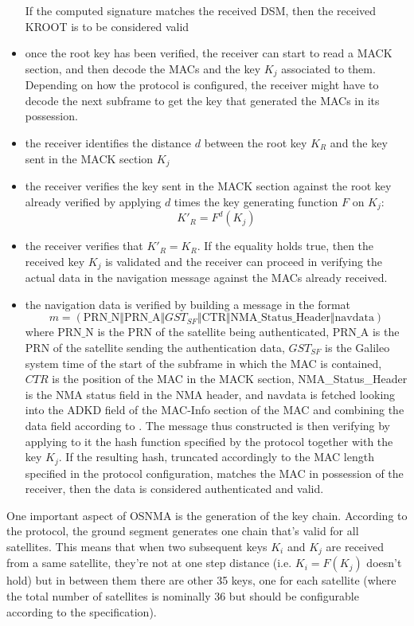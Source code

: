 \begin{itemize}
If the computed signature matches the received DSM, then the received KROOT is
to be considered valid
\item once the root key has been verified, the receiver can start to read a MACK
section, and then decode the MACs and the key $K_j$ associated to them.
Depending on how the protocol is configured, the receiver might have to decode
the next subframe to get the key that generated the MACs in its possession.
\item the receiver identifies the distance $d$ between the root key $K_R$ and
the key sent in the MACK section $K_j$
\item the receiver verifies the key sent in the MACK section against the root
key already verified by applying $d$ times the key generating function $F$ on
$K_j$:
\[
K'_R = F^d(K_j)
\]
\item the receiver verifies that $K'_R = K_R$. If the equality holds true, then
the received key $K_j$ is validated and the receiver can proceed in verifying
the actual data in the navigation message against the MACs already received.
\item the navigation data is verified by building a message in the format
\[
m = (\text{PRN\_N} \Vert \text{PRN\_A} \Vert GST_{SF} \Vert \text{CTR} \Vert
\text{NMA\_Status\_Header} \Vert \text{navdata})
\]
where $\text{PRN\_N}$ is the PRN of the satellite being authenticated,
$\text{PRN\_A}$ is the PRN of the satellite sending the authentication data,
$GST_{SF}$ is the Galileo system time of the start of the subframe in which the
MAC is contained, $CTR$ is the position of the MAC in the MACK section,
NMA\_Status\_Header is the NMA status field in the NMA header, and
$\text{navdata}$ is fetched looking into the ADKD field of the MAC-Info section
of the MAC and combining the data field according to \cite{osnma}. The message
thus constructed is then verifying by applying to it the hash function specified
by the protocol together with the key $K_j$. If the resulting hash, truncated
accordingly to the MAC length specified in the protocol configuration, matches
the MAC in possession of the receiver, then the data is considered authenticated
and valid.
\end{itemize}

\par

One important aspect of OSNMA is the generation of the key chain. According to
the protocol, the ground segment generates one chain that's valid for all
satellites. This means that when two subsequent keys $K_i$ and $K_j$ are
received from a same satellite, they're not at one step distance (i.e. $K_i =
F(K_j)$ doesn't hold) but in between them there are other 35 keys, one for each
satellite (where the total number of satellites is nominally 36 but should be
configurable according to the specification).
